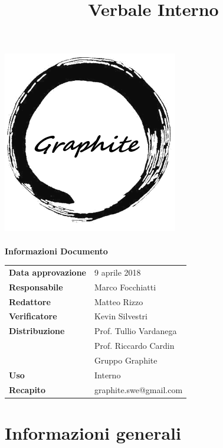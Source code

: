 \documentclass[openany,12pt,a4paper]{article}
\title{Verbale Interno}
\author{}
\begin{document}
 
  \makeatletter 
  \begin{titlepage} 
    \setlength{\headsep}{0pt}   
    \begin{center} 
      \includegraphics[width=0.5\linewidth]{Logo.png}\\[1em] 
      {\huge \bfseries  \@title }\\[10ex] 
      \textbf{\Large Informazioni Documento} \\[2em] 
      \bgroup 
      \def\arraystretch{1.5} 
      \begin{tabular}{l|l} 
        \textbf{Data approvazione} & 9 aprile 2018 \\ 
        \textbf{Responsabile} & Marco Focchiatti \\ 
        \textbf{Redattore} & Matteo Rizzo \\ 
        \textbf{Verificatore} & Kevin Silvestri \\ 
        \textbf{Distribuzione} & Prof. Tullio Vardanega \\ 
         & Prof. Riccardo Cardin \\ 
         & Gruppo Graphite \\ 
        \textbf{Uso} & Interno \\ 
        \textbf{Recapito} & graphite.swe@gmail.com \\ 
      \end{tabular} 
    \egroup 
    \end{center} 
  \end{titlepage} 
  \makeatother 
 
  \thispagestyle{empty} 
  \newpage 
   
  \tableofcontents 
  \newpage 
   
  \section{Informazioni generali} 
   
\end{document}
